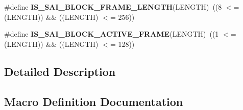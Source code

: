 \begin{DoxyCompactItemize}
\item 
\#define {\bfseries I\+S\+\_\+\+S\+A\+I\+\_\+\+B\+L\+O\+C\+K\+\_\+\+F\+R\+A\+M\+E\+\_\+\+L\+E\+N\+G\+TH}(L\+E\+N\+G\+TH)~((8 $<$= (L\+E\+N\+G\+TH)) \&\& ((L\+E\+N\+G\+TH) $<$= 256))\hypertarget{group___s_a_i___private___macros_ga929b19503995ec82769340025275a91a}{}\label{group___s_a_i___private___macros_ga929b19503995ec82769340025275a91a}

\item 
\#define {\bfseries I\+S\+\_\+\+S\+A\+I\+\_\+\+B\+L\+O\+C\+K\+\_\+\+A\+C\+T\+I\+V\+E\+\_\+\+F\+R\+A\+ME}(L\+E\+N\+G\+TH)~((1 $<$= (L\+E\+N\+G\+TH)) \&\& ((L\+E\+N\+G\+TH) $<$= 128))\hypertarget{group___s_a_i___private___macros_ga2d8eaaf3ac369f60698177a96c8675ca}{}\label{group___s_a_i___private___macros_ga2d8eaaf3ac369f60698177a96c8675ca}

\end{DoxyCompactItemize}


\subsection{Detailed Description}


\subsection{Macro Definition Documentation}
